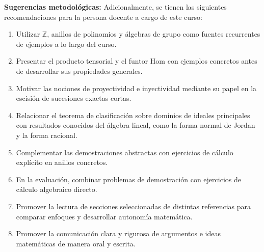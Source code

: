 \begin{refsection}
\textbf{Sugerencias metodológicas:} Adicionalmente, se tienen las siguientes recomendaciones para la persona docente a cargo de este curso:
\begin{enumerate}
    \item Utilizar $\mathbb{Z}$, anillos de polinomios y álgebras de grupo como fuentes recurrentes de ejemplos a lo largo del curso.
    \item Presentar el producto tensorial y el funtor $\mathrm{Hom}$ con ejemplos concretos antes de desarrollar sus propiedades generales.
    \item Motivar las nociones de proyectividad e inyectividad mediante su papel en la escisión de sucesiones exactas cortas.
    \item Relacionar el teorema de clasificación sobre dominios de ideales principales con resultados conocidos del álgebra lineal, como la forma normal de Jordan y la forma racional.
    \item Complementar las demostraciones abstractas con ejercicios de cálculo explícito en anillos concretos.
    \item En la evaluación, combinar problemas de demostración con ejercicios de cálculo algebraico directo.
    \item Promover la lectura de secciones seleccionadas de distintas referencias para comparar enfoques y desarrollar autonomía matemática.
    \item Promover la comunicación clara y rigurosa de argumentos e ideas matemáticas de manera oral y escrita.
\end{enumerate}


\nocite{dummit2004abstract}
\nocite{lang2002algebra}
\nocite{rotman2010advanced}
\nocite{weibel1994homological}
\nocite{rotman2009homological}
\nocite{atiyah1969commutative}
\nocite{jacobson1989basic}
\printcursosbibliography

\end{refsection}
